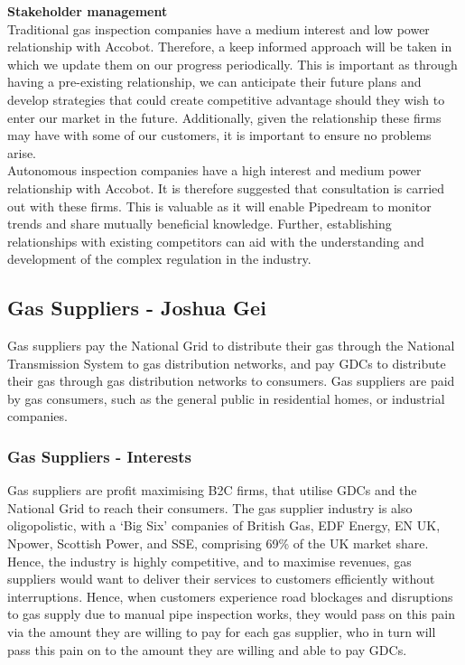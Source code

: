 \documentclass[11pt]{article}		%
\begin{document}
            \textbf{Stakeholder management}\\
            Traditional gas inspection companies have a medium interest and low power relationship with Accobot. Therefore, a keep informed approach will be taken in which we update them on our progress periodically. This is important as through having a pre-existing relationship, we can anticipate their future plans and develop strategies that could create competitive advantage should they wish to enter our market in the future. Additionally, given the relationship these firms may have with some of our customers, it is important to ensure no problems arise. \\
            \hspace*{3ex}Autonomous inspection companies have a high interest and medium power relationship with Accobot. It is therefore suggested that consultation is carried out with these firms. This is valuable as it will enable Pipedream to monitor trends and share mutually beneficial knowledge. Further, establishing relationships with existing competitors can aid with the understanding and development of the complex regulation in the industry.

		\subsection[Gas Suppliers]{Gas Suppliers - Joshua Gei}
		Gas suppliers pay the National Grid to distribute their gas through the National Transmission System to gas distribution networks, and pay GDCs to distribute their gas through gas distribution networks to consumers. Gas suppliers are paid by gas consumers, such as the general public in residential homes, or industrial companies.   
		\subsubsection{Gas Suppliers - Interests}
	    Gas suppliers are profit maximising B2C firms, that utilise GDCs and the National Grid to reach their consumers. The gas supplier industry is also oligopolistic, with a ‘Big Six’ companies of British Gas, EDF Energy, EN UK, Npower, Scottish Power, and SSE, comprising 69\% of the UK market share. 
        \\Hence, the industry is highly competitive, and to maximise revenues, gas suppliers would want to deliver their services to customers efficiently without interruptions. Hence, when customers experience road blockages and disruptions to gas supply due to manual pipe inspection works, they would pass on this pain via the amount they are willing to pay for each gas supplier, who in turn will pass this pain on to the amount they are willing and able to pay GDCs.
\end{document}
